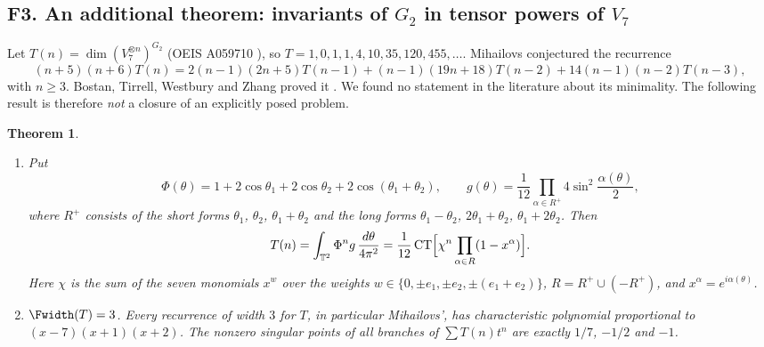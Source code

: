 \documentclass[11pt,a4paper]{article}
\newtheorem{theorem}{Theorem}[section]
\theoremstyle{definition}
\theoremstyle{remark}
\numberwithin{equation}{section}
\DeclareMathOperator{\CT}{CT}
\begin{document}
\subsection{F3. An additional theorem: invariants of \texorpdfstring{$G_2$}{G2} in tensor powers of \texorpdfstring{$V_7$}{V7}}\label{B:F:ssec:g2}

Let $T(n)=\dim(V_7^{\otimes n})^{G_2}$ (OEIS A059710 \cite{R063}), so
$T=1,0,1,1,4,10,35,120,455,\dots$. Mihailovs conjectured the recurrence
\[
(n+5)(n+6)T(n)=2(n-1)(2n+5)T(n-1)+(n-1)(19n+18)T(n-2)+14(n-1)(n-2)T(n-3),
\]
with $n\ge3$. Bostan, Tirrell, Westbury and Zhang proved it
\cite[Theorem~1.3]{R059}. We found no statement in the literature about
its minimality. The following result is therefore \emph{not} a closure of
an explicitly posed problem.

\begin{theorem}\label{B:F:thm:g2}
\begin{enumerate}
\item Put
\[
 \Phi(\theta)=1+2\cos\theta_1+2\cos\theta_2+2\cos(\theta_1+\theta_2),\qquad
 g(\theta)=\frac1{12}\prod_{\alpha\in R^+}4\sin^2\frac{\alpha(\theta)}2,
\]
where $R^+$ consists of the short forms $\theta_1$, $\theta_2$,
$\theta_1+\theta_2$ and the long forms $\theta_1-\theta_2$,
$2\theta_1+\theta_2$, $\theta_1+2\theta_2$. Then
\[
 T(n)=\int_{\mathbb T^2}\Phi^n g\,\frac{d\theta}{4\pi^2}
 =\frac1{12}\CT\Bigl[\chi^n\prod_{\alpha\in R}(1-x^\alpha)\Bigr].
\]
Here $\chi$ is the sum of the seven monomials $x^w$ over the weights
$w\in\{0,\pm e_1,\pm e_2,\pm(e_1+e_2)\}$, $R=R^+\cup(-R^+)$, and
$x^\alpha=e^{i\alpha(\theta)}$.
\item $\Fwidth(T)=3$. Every recurrence of width $3$ for $T$, in particular
Mihailovs', has characteristic polynomial proportional to
$(x-7)(x+1)(x+2)$. The nonzero singular points of all branches of
$\sum T(n)t^n$ are exactly $1/7$, $-1/2$ and $-1$.
\end{enumerate}
\end{theorem}
\end{document}
